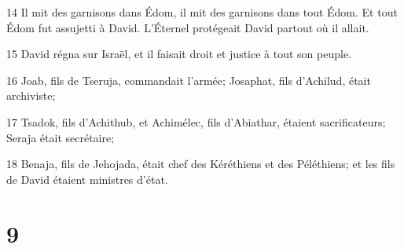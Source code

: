 \par 14 Il mit des garnisons dans Édom, il mit des garnisons dans tout Édom. Et tout Édom fut assujetti à David. L'Éternel protégeait David partout où il allait.
\par 15 David régna sur Israël, et il faisait droit et justice à tout son peuple.
\par 16 Joab, fils de Tseruja, commandait l'armée; Josaphat, fils d'Achilud, était archiviste;
\par 17 Tsadok, fils d'Achithub, et Achimélec, fils d'Abiathar, étaient sacrificateurs; Seraja était secrétaire;
\par 18 Benaja, fils de Jehojada, était chef des Kéréthiens et des Péléthiens; et les fils de David étaient ministres d'état.

\chapter{9}

